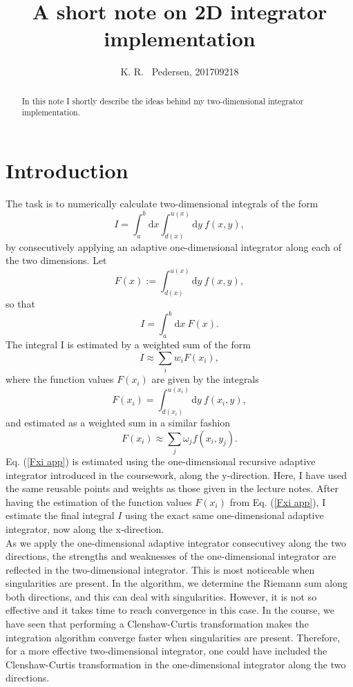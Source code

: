 \documentclass{article}
\title{A short note on 2D integrator implementation}
\author{K. R. ~Pedersen, 201709218}
\date{}
\begin{document}
\lstset{language=C}
\maketitle

\begin{abstract}
In this note I shortly describe the ideas behind my two-dimensional integrator implementation.
\end{abstract}

\section{Introduction}
The task is to numerically calculate two-dimensional integrals of the form
\begin{equation}
	I = \int_a^b {\mathrm d x} \int_{d(x)}^{u(x)} {\mathrm d y} \: f(x,y),
	\label{integral}
\end{equation}
by consecutively applying an adaptive one-dimensional integrator along each of the two dimensions. Let
\begin{equation}
	F(x):= \int_{d(x)}^{u(x)} {\mathrm d y} \: f(x,y),
	\label{define F}
\end{equation}
so that
\begin{equation}
	I=\int_a^b {\mathrm d x} \: F(x).
	\label{I short}
\end{equation}
The integral I is estimated by a weighted sum of the form
\begin{equation}
	I \approx \sum_i w_iF(x_i),
	\label{I app}
\end{equation}
where the function values $F(x_i)$ are given by the integrals
\begin{equation}
	F(x_i) = \int_{d(x_i)}^{u(x_i)} {\mathrm d y} \: f(x_i, y),
	\label{Fxi def}
\end{equation}
and estimated as a weighted sum in a similar fashion
\begin{equation}
	F(x_i) \approx \sum_j \omega_j f(x_i, y_j).
	\label{Fxi app}
\end{equation}
Eq. (\ref{Fxi app}) is estimated using the one-dimensional recursive adaptive integrator introduced in the coursework, along the y-direction. Here, I have used the same reusable points and weights as those given in the lecture notes. After having the estimation of the function values $F(x_i)$ from Eq. (\ref{Fxi app}), I estimate the final integral $I$ using the exact same one-dimensional adaptive integrator, now along the x-direction.\\ 
As we apply the one-dimensional adaptive integrator consecutivey along the two directions, the strengths and weaknesses of the one-dimensional integrator are reflected in the two-dimensional integrator. This is most noticeable when singularities are present. In the algorithm, we determine the Riemann sum along both directions, and this can deal with singularities. However, it is not so effective and it takes time to reach convergence in this case. In the course, we have seen that performing a Clenshaw-Curtis transformation makes the integration algorithm converge faster when singularities are present. Therefore, for a more effective two-dimensional integrator, one could have included the Clenshaw-Curtis transformation in the one-dimensional integrator along the two directions. 
\end{document}
